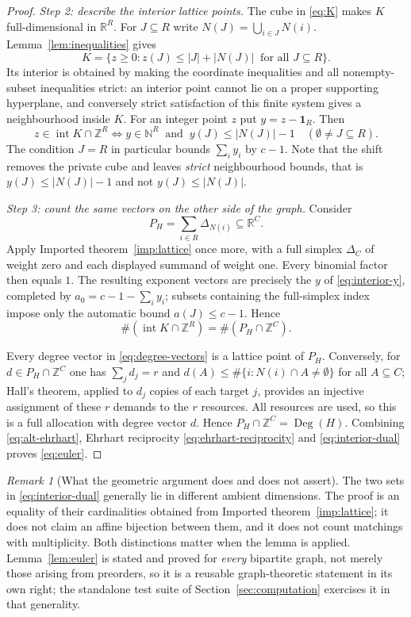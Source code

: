 \documentclass[11pt]{article}
\numberwithin{equation}{section}
\theoremstyle{definition}
\theoremstyle{remark}
\newtheorem{remark}[theorem]{Remark}
\newcommand{\N}{\mathbb N}
\newcommand{\Z}{\mathbb Z}
\newcommand{\R}{\mathbb R}
\newcommand{\one}{\mathbf 1}
\newcommand{\Int}{\operatorname{int}}
\newcommand{\Deg}{\operatorname{Deg}}
\begin{document}
\begin{proof}
\smallskip\noindent\emph{Step 2: describe the interior lattice points.}
The cube in \eqref{eq:K} makes $K$ full-dimensional in $\R^R$. For
$J\subseteq R$ write $N(J)=\bigcup_{i\in J}N(i)$. Lemma~\ref{lem:inequalities}
gives
\[
 K=\{z\ge0:z(J)\le |J|+|N(J)|\ \text{ for all }J\subseteq R\}.
\]
Its interior is obtained by making the coordinate inequalities and all
nonempty-subset inequalities strict: an interior point cannot lie on a proper
supporting hyperplane, and conversely strict satisfaction of this finite
system gives a neighbourhood inside $K$. For an integer point $z$ put
$y=z-\one_R$. Then
\begin{equation}
 z\in\Int K\cap\Z^R
 \iff
 y\in\N^R\ \text{ and }\ y(J)\le|N(J)|-1
                   \quad(\emptyset\ne J\subseteq R).
 \label{eq:interior-y}
\end{equation}
The condition $J=R$ in particular bounds $\sum_iy_i$ by $c-1$. Note that the
shift removes the private cube and leaves \emph{strict} neighbourhood bounds,
that is $y(J)\le|N(J)|-1$ and not $y(J)\le|N(J)|$.

\smallskip\noindent\emph{Step 3: count the same vectors on the other side of
the graph.} Consider
\[
 P_H=\sum_{i\in R}\Delta_{N(i)}\subseteq\R^{C}.
\]
Apply Imported theorem~\ref{imp:lattice} once more, with a full simplex
$\Delta_C$ of weight zero and each displayed summand of weight one. Every
binomial factor then equals $1$. The resulting exponent vectors are precisely
the $y$ of \eqref{eq:interior-y}, completed by $a_0=c-1-\sum_iy_i$; subsets
containing the full-simplex index impose only the automatic bound
$a(J)\le c-1$. Hence
\begin{equation}
 \#(\Int K\cap\Z^R)=\#(P_H\cap\Z^{C}).
 \label{eq:interior-dual}
\end{equation}

Every degree vector in \eqref{eq:degree-vectors} is a lattice point of $P_H$.
Conversely, for $d\in P_H\cap\Z^{C}$ one has $\sum_jd_j=r$ and
$d(A)\le\#\{i:N(i)\cap A\ne\emptyset\}$ for all $A\subseteq C$; Hall's
theorem, applied to $d_j$ copies of each target $j$, provides an injective
assignment of these $r$ demands to the $r$ resources. All resources are used,
so this is a full allocation with degree vector $d$. Hence
$P_H\cap\Z^{C}=\Deg(H)$. Combining \eqref{eq:alt-ehrhart}, Ehrhart
reciprocity \eqref{eq:ehrhart-reciprocity} and \eqref{eq:interior-dual} proves
\eqref{eq:euler}.
\end{proof}

\begin{remark}[What the geometric argument does and does not assert]
The two sets in \eqref{eq:interior-dual} generally lie in different ambient
dimensions. The proof is an equality of their cardinalities obtained from
Imported theorem~\ref{imp:lattice}; it does not claim an affine bijection
between them, and it does not count matchings with multiplicity. Both
distinctions matter when the lemma is applied. Lemma~\ref{lem:euler} is
stated and proved for \emph{every} bipartite graph, not merely those arising
from preorders, so it is a reusable graph-theoretic statement in its own
right; the standalone test suite of Section~\ref{sec:computation} exercises it
in that generality.
\end{remark}
\end{document}
